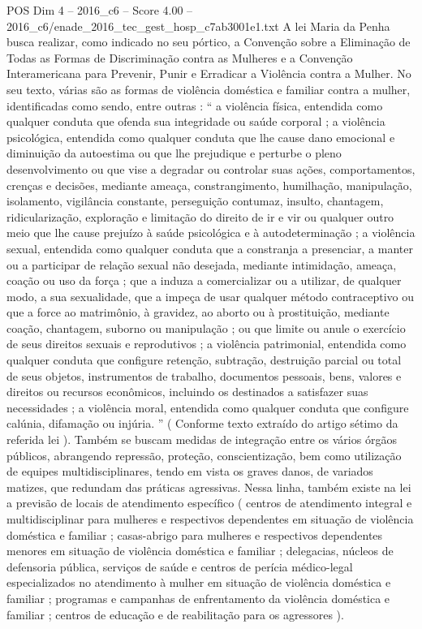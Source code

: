 \begin{textsample}{POS Dim 4 – 2016\_c6 – Score 4.00 – 2016\_c6/enade\_2016\_tec\_gest\_hosp\_c7ab3001e1.txt}
A lei Maria da Penha busca realizar, como indicado no seu pórtico, a Convenção sobre a Eliminação de Todas as Formas de Discriminação contra as Mulheres e a Convenção Interamericana para Prevenir, Punir e Erradicar a Violência contra a Mulher.
No seu texto, várias são as formas de violência doméstica e familiar contra a mulher, identificadas como sendo, entre outras : “ a violência física, entendida como qualquer conduta que ofenda sua integridade ou saúde corporal ; a violência psicológica, entendida como qualquer conduta que lhe cause dano emocional e diminuição da autoestima ou que lhe prejudique e perturbe o pleno desenvolvimento ou que vise a degradar ou controlar suas ações, comportamentos, crenças e decisões, mediante ameaça, constrangimento, humilhação, manipulação, isolamento, vigilância constante, perseguição contumaz, insulto, chantagem, ridicularização, exploração e limitação do direito de ir e vir ou qualquer outro meio que lhe cause prejuízo à saúde psicológica e à autodeterminação ; a violência sexual, entendida como qualquer conduta que a constranja a presenciar, a manter ou a participar de relação sexual não desejada, mediante intimidação, ameaça, coação ou uso da força ; que a induza a comercializar ou a utilizar, de qualquer modo, a sua sexualidade, que a impeça de usar qualquer método contraceptivo ou que a force ao matrimônio, à gravidez, ao aborto ou à prostituição, mediante coação, chantagem, suborno ou manipulação ; ou que limite ou anule o exercício de seus direitos sexuais e reprodutivos ; a violência patrimonial, entendida como qualquer conduta que configure retenção, subtração, destruição parcial ou total de seus objetos, instrumentos de trabalho, documentos pessoais, bens, valores e direitos ou recursos econômicos, incluindo os destinados a satisfazer suas necessidades ; a violência moral, entendida como qualquer conduta que configure calúnia, difamação ou injúria. ” ( Conforme texto extraído do artigo sétimo da referida lei ).
Também se buscam medidas de integração entre os vários órgãos públicos, abrangendo repressão, proteção, conscientização, bem como utilização de equipes multidisciplinares, tendo em vista os graves danos, de variados matizes, que redundam das práticas agressivas.
Nessa linha, também existe na lei a previsão de locais de atendimento específico ( centros de atendimento integral e multidisciplinar para mulheres e respectivos dependentes em situação de violência doméstica e familiar ; casas-abrigo para mulheres e respectivos dependentes menores em situação de violência doméstica e familiar ; delegacias, núcleos de defensoria pública, serviços de saúde e centros de perícia médico-legal especializados no atendimento à mulher em situação de violência doméstica e familiar ; programas e campanhas de enfrentamento da violência doméstica e familiar ; centros de educação e de reabilitação para os agressores ).

\end{textsample}
